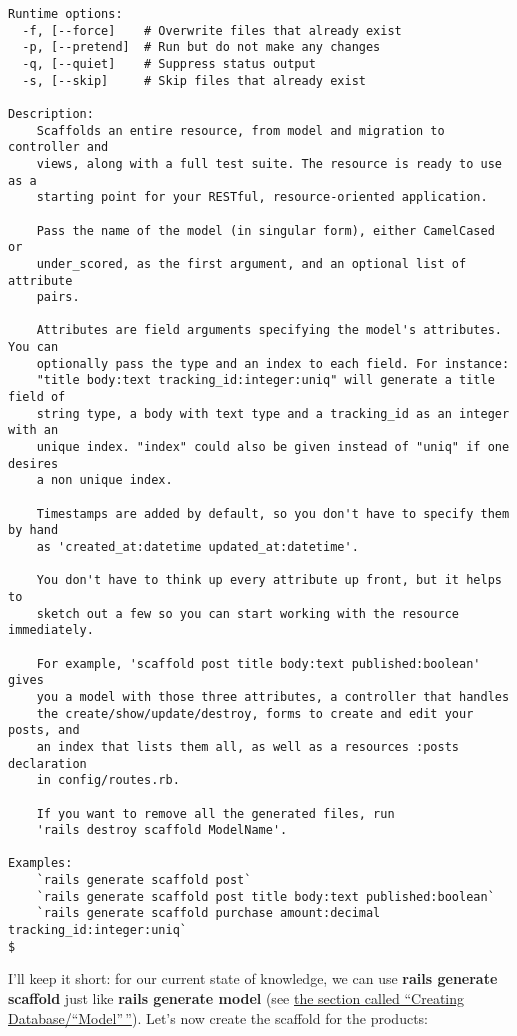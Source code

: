 \documentclass[a4paper]{book}
\newcounter{tab}[chapter]
\begin{document}
\begin{shaded}
\begin{verbatim}
Runtime options:
  -f, [--force]    # Overwrite files that already exist
  -p, [--pretend]  # Run but do not make any changes
  -q, [--quiet]    # Suppress status output
  -s, [--skip]     # Skip files that already exist

Description:
    Scaffolds an entire resource, from model and migration to controller and
    views, along with a full test suite. The resource is ready to use as a
    starting point for your RESTful, resource-oriented application.

    Pass the name of the model (in singular form), either CamelCased or
    under_scored, as the first argument, and an optional list of attribute
    pairs.

    Attributes are field arguments specifying the model's attributes. You can
    optionally pass the type and an index to each field. For instance:
    "title body:text tracking_id:integer:uniq" will generate a title field of
    string type, a body with text type and a tracking_id as an integer with an
    unique index. "index" could also be given instead of "uniq" if one desires
    a non unique index.

    Timestamps are added by default, so you don't have to specify them by hand
    as 'created_at:datetime updated_at:datetime'.

    You don't have to think up every attribute up front, but it helps to
    sketch out a few so you can start working with the resource immediately.

    For example, 'scaffold post title body:text published:boolean' gives
    you a model with those three attributes, a controller that handles
    the create/show/update/destroy, forms to create and edit your posts, and
    an index that lists them all, as well as a resources :posts declaration
    in config/routes.rb.

    If you want to remove all the generated files, run
    'rails destroy scaffold ModelName'.

Examples:
    `rails generate scaffold post`
    `rails generate scaffold post title body:text published:boolean`
    `rails generate scaffold purchase amount:decimal tracking_id:integer:uniq`
$
\end{verbatim}\end{shaded}

I'll keep it short: for our current state of knowledge, we can use \textbf{rails generate scaffold} just like \textbf{rails generate model} (see \hyperref[activerecordux5fdatenbankux5fanlegen]{the section called “Creating Database/``Model”\,''}). Let's now create the scaffold for the products:
\end{document}
